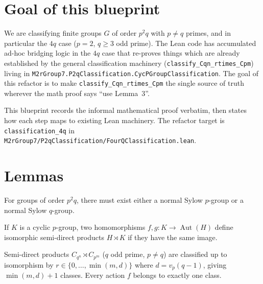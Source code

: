 


\section{Goal of this blueprint}

We are classifying finite groups $G$ of order $p^2 q$ with $p \neq q$ primes,
and in particular the $4q$ case ($p = 2$, $q \geq 3$ odd prime). The Lean code
has accumulated ad-hoc bridging logic in the $4q$ case that re-proves things
which are already established by the general classification machinery
(\texttt{classify\_Cqn\_rtimes\_Cpm}) living in
\texttt{M2rGroup7.P2qClassification.CycPGroupClassification}. The goal of this
refactor is to make \texttt{classify\_Cqn\_rtimes\_Cpm} the single source of
truth wherever the math proof says ``use Lemma~3''.

This blueprint records the informal mathematical proof verbatim, then states
how each step maps to existing Lean machinery. The refactor target is
\texttt{classification\_4q} in
\texttt{M2rGroup7/P2qClassification/FourQClassification.lean}.

\section{Lemmas}

\begin{lemma}
    \label{lem:p2q-normal-sylow}
    For groups of order $p^2 q$, there must exist either a normal Sylow
    $p$-group or a normal Sylow $q$-group.
\end{lemma}

\begin{lemma}
    \label{lem:same-image-sdp}
    If $K$ is a cyclic $p$-group, two homomorphisms $f, g : K \to
    \operatorname{Aut}(H)$ define isomorphic semi-direct products $H \rtimes K$
    if they have the same image.
\end{lemma}

\begin{lemma}
    \label{lem:classify-Cqn-Cpm}
    Semi-direct products $C_{q^n} \rtimes C_{p^m}$ ($q$ odd prime, $p \neq q$)
    are classified up to isomorphism by $r \in \{0, \ldots, \min(m, d)\}$
    where $d = v_p(q - 1)$, giving $\min(m, d) + 1$ classes. Every action $f$
    belongs to exactly one class.
\end{lemma}

